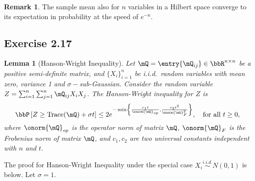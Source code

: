 \documentclass[11pt]{article}
\DeclareMathOperator{\tr}{Trace}
\newcommand{\off}[1]{\left[#1\right]}
\newcommand{\offf}[1]{\left\{#1\right\}}
\theoremstyle{plain}
\newtheorem{lem}{Lemma}
\theoremstyle{definition}
\newtheorem{rmk}{Remark}
\begin{document}
    \begin{rmk}
    	The sample mean also for $n$ variables in a Hilbert space converge to its expectation in probability at the speed of $e^{-n}$.
    \end{rmk}
    
    \subsection{Exercise 2.17}
    \begin{lem}[Hanson-Wright Inequality]
   Let $\mQ = \entry{\mQ_{ij}}  \in \bbR^{n \times n} $ be a positive semi-definite matrix, and $\{X_i\}_{i = 1}^n$ be i.i.d.\ random variables with mean zero, variance 1 and $\sigma-$sub-Gaussian. Consider the random variable $Z = \sum_{i= 1}^n \sum_{j = 1}^n \mQ_{ij} X_i X_j$. The Hanson-Wright inequality for $Z$ is
   \begin{equation}
   	\bbP \off{Z \geq \tr (\mQ) + \sigma t } \leq 2 e^{- \min \offf{\frac{c_1 t}{\onorm{\mQ}_{op}  } , \frac{c_2 t^2}{\onorm{\mQ}^2_F} }}, \quad \text{for all } t \geq 0,
   \end{equation}
   where $\onorm{\mQ}_{op}$ is the operator norm of matrix $\mQ$, $\onorm{\mQ}_F$ is the Frobenius norm of matrix $\mQ$, and $c_1,c_2$ are two universal constants independent with $n$ and $t$.
    \end{lem}
    
    The proof for Hanson-Wright Inequality under the special case  $X_i \stackrel{i.i.d.}{\sim} N(0,1)$ is below. Let $\sigma  = 1$.
    
\end{document}

